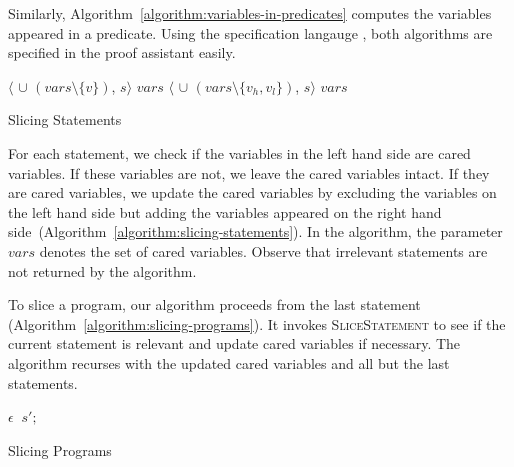 Similarly, Algorithm~\ref{algorithm:variables-in-predicates} computes
the variables appeared in a predicate. Using the \coq specification
langauge \gallina, both algorithms are specified in the proof
assistant easily. 

\begin{algorithm}
  \begin{algorithmic}[1]
          {\Return $\langle$ 
            $\cup$ $(\mathit{vars} \setminus \{ v \})$, $s \rangle$}
          {\Return $\mathit{vars}$}
      \EndCase
          {\Return $\langle$ $\cup$ 
            $(\mathit{vars} \setminus \{ v_h, v_l \})$, $s \rangle$}
          {\Return $\mathit{vars}$}
      \EndCase
    \EndMatch
    \EndFunction
  \end{algorithmic}
  \caption{Slicing Statements}
  \label{algorithm:slicing-statements}
\end{algorithm}

For each statement, we check if the variables in the left hand side are
cared variables. If these variables are not, we leave the cared
variables intact. If they are cared variables, we update the cared
variables by excluding the variables on the left hand side but adding
the variables appeared on the right hand
side~(Algorithm~\ref{algorithm:slicing-statements}). In the algorithm, 
the parameter $\mathit{vars}$ denotes the set of cared variables.
Observe that irrelevant statements are not returned by the algorithm.

To slice a program, our algorithm proceeds from the last statement
(Algorithm~\ref{algorithm:slicing-programs}). It invokes
\textsc{SliceStatement} to see if the current statement is relevant
and update cared variables if necessary. The algorithm recurses with
the updated cared variables and all but the last statements.

\begin{algorithm}
  \begin{algorithmic}[1]
      \Case{$\epsilon$}
        \Return $\epsilon$
      \EndCase
            \Return {}
          \EndCase
            \Return {}$\ s';$
          \EndCase
        \EndMatch
      \EndCase
    \EndMatch
    \EndFunction
  \end{algorithmic}
  \caption{Slicing Programs}
  \label{algorithm:slicing-programs}
\end{algorithm}

